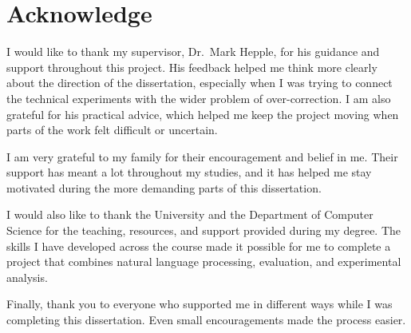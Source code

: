 \chapter*{\Large \center Acknowledge}

I would like to thank my supervisor, Dr.~Mark Hepple, for his guidance and support throughout this project. His feedback helped me think more clearly about the direction of the dissertation, especially when I was trying to connect the technical experiments with the wider problem of over-correction. I am also grateful for his practical advice, which helped me keep the project moving when parts of the work felt difficult or uncertain.

I am very grateful to my family for their encouragement and belief in me. Their support has meant a lot throughout my studies, and it has helped me stay motivated during the more demanding parts of this dissertation.

I would also like to thank the University and the Department of Computer Science for the teaching, resources, and support provided during my degree. The skills I have developed across the course made it possible for me to complete a project that combines natural language processing, evaluation, and experimental analysis.

Finally, thank you to everyone who supported me in different ways while I was completing this dissertation. Even small encouragements made the process easier.
